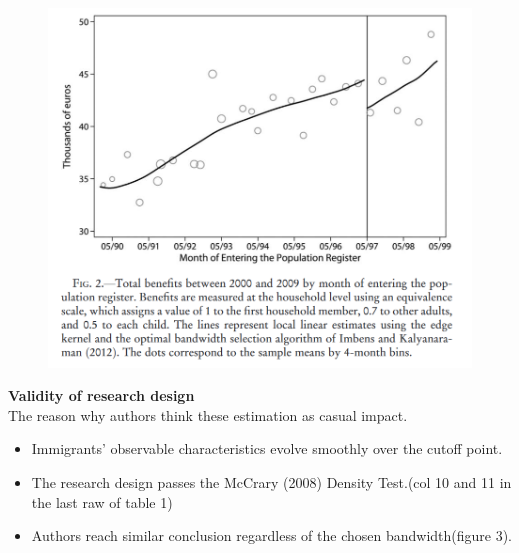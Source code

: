 \documentclass[../root]{subfiles}
\begin{document}
    \begin{figure}[h]
        \includegraphics[width=12cm]{0703sugiyama/Figure2.png}
    \end{figure}
    
    {\bf Validity of research design} \\
    The reason why authors think these estimation as casual impact.
    \begin{itemize}
        \item Immigrants' observable characteristics evolve smoothly over the cutoff point.
        \item The research design passes the McCrary (2008) Density Test.(col 10 and 11 in the last raw of table 1)
        \item Authors reach similar conclusion regardless of the chosen bandwidth(figure 3).
    \end{itemize}
    
\end{document}
